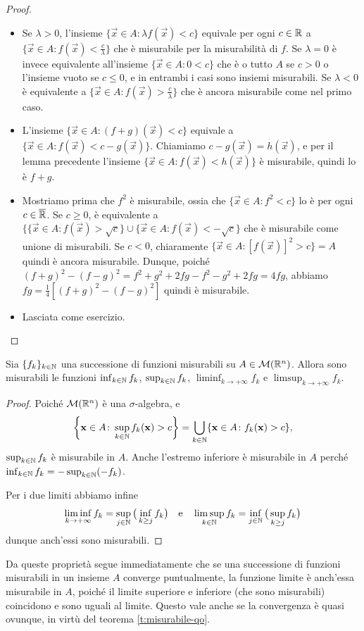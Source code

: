 \begin{proof}
	\begin{itemize}
		\item Se $\lambda>0$, l'insieme $\{\vec x\in A\colon \lambda f(\vec x)<c\}$ equivale per ogni $c\in\mathbb{R}$ a $\{\vec x\in A\colon f(\vec x)<\frac{c}{\lambda}\}$ che è misurabile per la misurabilità di $f$.
			Se $\lambda=0$ è invece equivalente all'insieme $\{\vec x\in A\colon 0<c\}$ che è o tutto $A$ se $c>0$ o l'insieme vuoto se $c\leq 0$, e in entrambi i casi sono insiemi misurabili.
			Se $\lambda<0$ è equivalente a $\{\vec x\in A\colon f(\vec x)>\frac{c}{\lambda}\}$ che è ancora misurabile come nel primo caso.
		\item L'insieme $\{\vec x\in A\colon (f+g)(\vec x)<c\}$ equivale a $\{\vec x\in A\colon f(\vec x)<c-g(\vec x)\}$.
			Chiamiamo $c-g(\vec x)=h(\vec x)$, e per il lemma precedente l'insieme $\{\vec x\in A\colon f(\vec x)<h(\vec x)\}$ è misurabile, quindi lo è $f+g$.
		\item Mostriamo prima che $f^2$ è misurabile, ossia che $\{\vec x\in A\colon f^2<c\}$ lo è per ogni $c\in\overline{\mathbb{R}}$.
			Se $c\geq 0$, è equivalente a $\{\{\vec x\in A\colon f(\vec x)>\sqrt{c}\}\cup\{\vec x\in A\colon f(\vec x)<-\sqrt{c}\}$ che è misurabile come unione di misurabili.
			Se $c<0$, chiaramente $\{\vec x\in A\colon [f(\vec x)]^2>c\}=A$ quindi è ancora misurabile.
			Dunque, poich\'e $(f+g)^2-(f-g)^2=f^2+g^2+2fg-f^2-g^2+2fg=4fg$, abbiamo $fg=\frac14[(f+g)^2-(f-g)^2]$ quindi è misurabile.
		\item Lasciata come esercizio.\qedhere
	\end{itemize}
\end{proof}
\begin{proprieta} \label{pr:estremi-successioni-funzioni-misurabili}
	Sia $\{f_k\}_{k\in\mathbb{N}}$ una successione di funzioni misurabili su $A\in\mathcal M(\mathbb{R}^n)$.
	Allora sono misurabili le funzioni $\inf_{k\in\mathbb{N}}f_k$, $\sup_{k\in\mathbb{N}}f_k$, $\liminf_{k\to+\infty}f_k$ e $\limsup_{k\to+\infty}f_k$.
\end{proprieta}
\begin{proof}
	Poich\'e $\mathcal M(\mathbb{R}^n)$ è una $\sigma$-algebra, e
	\begin{equation}
		\bigg\{\mathbf{x}\in A\colon \sup_{k\in\mathbb{N}}f_k(\mathbf{x})>c\bigg\}=\bigcup_{k\in\mathbb{N}}\{\mathbf{x}\in A\colon f_k(\mathbf{x})>c\},
	\end{equation}
	$\sup_{k\in\mathbb{N}}f_k$ è misurabile in $A$.
	Anche l'estremo inferiore è misurabile in $A$ perch\'e $\inf_{k\in\mathbb{N}}f_k=-\sup_{k\in\mathbb{N}}(-f_k)$.

	Per i due limiti abbiamo infine
	\begin{equation}
		\liminf_{k\to+\infty}f_k=\sup_{j\in\mathbb{N}}\big(\inf_{k\geq j}f_k\big)\quad\text{e}\quad\limsup_{k\in\mathbb{N}}f_k=\inf_{j\in\mathbb{N}}\big(\sup_{k\geq j}f_k\big)
	\end{equation}
	dunque anch'essi sono misurabili.
\end{proof}
Da queste proprietà segue immediatamente che se una successione di funzioni misurabili in un insieme $A$ converge puntualmente, la funzione limite è anch'essa misurabile in $A$, poich\'e il limite superiore e inferiore (che sono misurabili) coincidono e sono uguali al limite.
Questo vale anche se la convergenza è quasi ovunque, in virtù del teorema \ref{t:misurabile-qo}.

